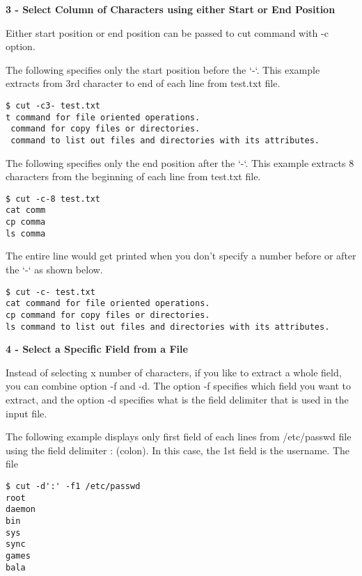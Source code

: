 \documentclass[a4paper,11pt,spanish]{article} %
\newenvironment{myscriptlisting}
{\begin{list}{}{\setlength{\leftmargin}{1em}}\item\scriptsize\bfseries}
{\end{list}}
\begin{document}
\textbf{3 - Select Column of Characters using either Start or End Position}

Either start position or end position can be passed to cut command with -c option.

The following specifies only the start position before the ‘-‘. This example
extracts from 3rd character to end of each line from test.txt file.

\begin{myscriptlisting}
 \begin{verbatim}
$ cut -c3- test.txt
t command for file oriented operations.
 command for copy files or directories.
 command to list out files and directories with its attributes.
 \end{verbatim}
\end{myscriptlisting}

The following specifies only the end position after the ‘-‘. This example 
extracts 8 characters from the beginning of each line from test.txt file.

\begin{myscriptlisting}
 \begin{verbatim}
$ cut -c-8 test.txt
cat comm
cp comma
ls comma
 \end{verbatim}
\end{myscriptlisting}

The entire line would get printed when you don’t specify a number before or
after the ‘-‘ as shown below.

\begin{myscriptlisting}
 \begin{verbatim}
$ cut -c- test.txt
cat command for file oriented operations.
cp command for copy files or directories.
ls command to list out files and directories with its attributes.
 \end{verbatim}
\end{myscriptlisting}

\textbf{4 - Select a Specific Field from a File}

Instead of selecting x number of characters, if you like to extract a whole field,
you can combine option -f and -d. The option -f specifies which field you want to
extract, and the option -d specifies what is the field delimiter that is used in the input file.

The following example displays only first field of each lines from /etc/passwd 
file using the field delimiter : (colon). In this case, the 1st field is the
username. The file

\begin{myscriptlisting}
 \begin{verbatim}
$ cut -d':' -f1 /etc/passwd
root
daemon
bin
sys
sync
games
bala
 \end{verbatim}
\end{myscriptlisting}
\end{document}
